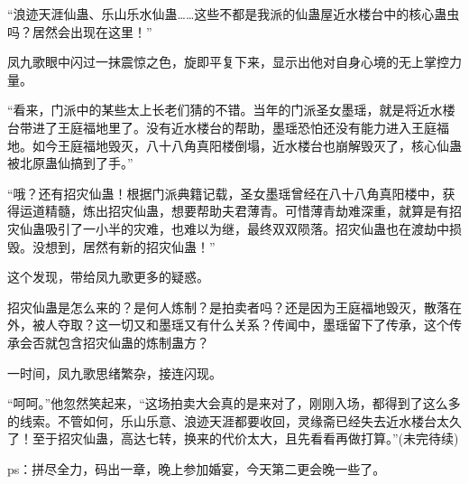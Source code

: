 \begin{this_body}
“浪迹天涯仙蛊、乐山乐水仙蛊……这些不都是我派的仙蛊屋近水楼台中的核心蛊虫吗？居然会出现在这里！”

凤九歌眼中闪过一抹震惊之色，旋即平复下来，显示出他对自身心境的无上掌控力量。

“看来，门派中的某些太上长老们猜的不错。当年的门派圣女墨瑶，就是将近水楼台带进了王庭福地里了。没有近水楼台的帮助，墨瑶恐怕还没有能力进入王庭福地。如今王庭福地毁灭，八十八角真阳楼倒塌，近水楼台也崩解毁灭了，核心仙蛊被北原蛊仙搞到了手。”

“哦？还有招灾仙蛊！根据门派典籍记载，圣女墨瑶曾经在八十八角真阳楼中，获得运道精髓，炼出招灾仙蛊，想要帮助夫君薄青。可惜薄青劫难深重，就算是有招灾仙蛊吸引了一小半的灾难，也难以为继，最终双双陨落。招灾仙蛊也在渡劫中损毁。没想到，居然有新的招灾仙蛊！”

这个发现，带给凤九歌更多的疑惑。

招灾仙蛊是怎么来的？是何人炼制？是拍卖者吗？还是因为王庭福地毁灭，散落在外，被人夺取？这一切又和墨瑶又有什么关系？传闻中，墨瑶留下了传承，这个传承会否就包含招灾仙蛊的炼制蛊方？

一时间，凤九歌思绪繁杂，接连闪现。

“呵呵。”他忽然笑起来，“这场拍卖大会真的是来对了，刚刚入场，都得到了这么多的线索。不管如何，乐山乐意、浪迹天涯都要收回，灵缘斋已经失去近水楼台太久了！至于招灾仙蛊，高达七转，换来的代价太大，且先看看再做打算。”(未完待续)

ps：拼尽全力，码出一章，晚上参加婚宴，今天第二更会晚一些了。

\end{this_body}

